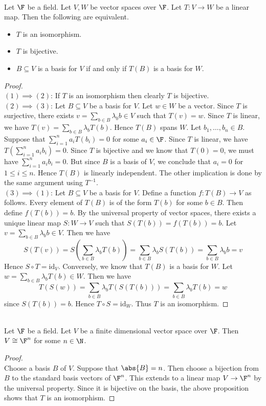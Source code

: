 \documentclass[a4paper]{article}
\begin{document}
\begin{prp}{}{}\\
Let $\F$ be a field. Let $V,W$ be vector spaces over $\F$. Let $T:V\to W$ be a linear map. Then the following are equivalent. 
\begin{itemize}
\item $T$ is an isomorphism. 
\item $T$ is bijective. 
\item $B\subseteq V$ is a basis for $V$ if and only if $T(B)$ is a basis for $W$. 
\end{itemize}
\begin{proof}\\
$(1)\implies(2)$: If $T$ is an isomorphism then clearly $T$ is bijective. \\

$(2)\implies(3)$: Let $B\subseteq V$ be a basis for $V$. Let $w\in W$ be a vector. Since $T$ is surjective, there exists $v=\sum_{b\in B}\lambda_bb\in V$ such that $T(v)=w$. Since $T$ is linear, we have $T(v)=\sum_{b\in B}\lambda_bT(b)$. Hence $T(B)$ spans $W$. Let $b_1,\dots,b_n\in B$. Suppose that $\sum_{i=1}^na_iT(b_i)=0$ for some $a_i\in\F$. Since $T$ is linear, we have $T\left(\sum_{i=1}^na_ib_i\right)=0$. Since $T$ is bijective and we know that $T(0)=0$, we must have $\sum_{i=1}^na_ib_i=0$. But since $B$ is a basis of $V$, we conclude that $a_i=0$ for $1\leq i\leq n$. Hence $T(B)$ is linearly independent. The other implication is done by the same argument using $T^{-1}$. \\

$(3)\implies(1)$: Let $B\subseteq V$ be a basis for $V$. Define a function $f:T(B)\to V$ as follows. Every element of $T(B)$ is of the form $T(b)$ for some $b\in B$. Then define $f(T(b))=b$. By the universal property of vector spaces, there exists a unique linear map $S:W\to V$ such that $S(T(b))=f(T(b))=b$. Let $v=\sum_{b\in B}\lambda_bb\in V$. Then we have $$S(T(v))=S\left(\sum_{b\in B}\lambda_bT(b)\right)=\sum_{b\in B}\lambda_bS(T(b))=\sum_{b\in B}\lambda_bb=v$$ Hence $S\circ T=\text{id}_V$. Conversely, we know that $T(B)$ is a basis for $W$. Let $w=\sum_{b\in B}\lambda_bT(b)\in W$. Then we have $$T(S(w))=\sum_{b\in B}\lambda_bT(S(T(b)))=\sum_{b\in B}\lambda_bT(b)=w$$ since $S(T(b))=b$. Hence $T\circ S=\text{id}_W$. Thus $T$ is an isomorphism. 
\end{proof}
\end{prp}

\begin{crl}{}{}\\
Let $\F$ be a field. Let $V$ be a finite dimensional vector space over $\F$. Then $V\cong\F^n$ for some $n\in\N$. 
\begin{proof}\\
Choose a basis $B$ of $V$. Suppose that $\abs{B}=n$. Then choose a bijection from $B$ to the standard basis vectors of $\F^n$. This extends to a linear map $V\to\F^n$ by the universal property. Since it is bijective on the basis, the above proposition shows that $T$ is an isomorphism. 
\end{proof}
\end{crl}
\end{document}

